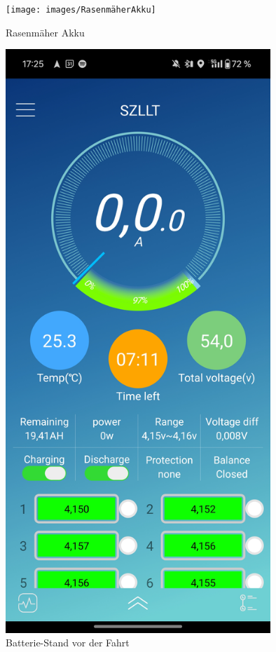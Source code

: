 \begin{figure}[h]
    \centering
    \texttt{[image: images/RasenmäherAkku]}
    \caption{Rasenmäher Akku\cite{lorenz_scherrer_selbst_2023}}
    \label{fig:20}
\end{figure}

\begin{figure}[h]
    \centering
    \includegraphics[width=10cm]{images/BMSvorderFahrt}
    \caption{Batterie-Stand vor der Fahrt\cite{lorenz_scherrer_selbst_2023}}
    \label{fig:31}
\end{figure}

